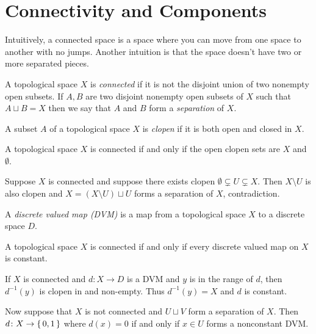 \documentclass[letterpaper, 11pt, oneside]{book}
\begin{document}
\clearpage

\chapter{Connectivity and Components}

Intuitively, a connected space is a space where you can move from one space to another with no jumps.
Another intuition is that the space doesn't have two or more separated pieces.

\begin{defn}
  A topological space $X$ is \emph{connected} if it is not the disjoint union of two nonempty open subsets.
  If $A, B$ are two disjoint nonempty open subsets of $X$ such that $A \sqcup B = X$ then we say that $A$ and $B$ form a \emph{separation} of $X$.
\end{defn}

\begin{defn}
  A subset $A$ of a topological space $X$ is \emph{clopen} if it is both open and closed in $X$.
\end{defn}

\begin{prop}
  A topological space $X$ is connected if and only if the open clopen sets are $X$ and $\emptyset$.
\end{prop}
\begin{prop}
  Suppose $X$ is connected and suppose there exists clopen $\emptyset \subsetneq U \subsetneq X$.
  Then $X \setminus U$ is also clopen and $X = (X \setminus U) \sqcup U$ forms a separation of $X$, contradiction.
\end{prop}

\begin{defn}
  A \emph{discrete valued map (DVM)} is a map from a topological space $X$ to a discrete space $D$.
\end{defn}

\begin{prop}
  A topological space $X$ is connected if and only if every discrete valued map on $X$ is constant.
\end{prop}
\begin{pf}
  If $X$ is connected and $d\colon X \to D$ is a DVM and $y$ is in the range of $d$, then $d^{-1}(y)$ is clopen in and non-empty.
  Thus $d^{-1}(y) = X$ and $d$ is constant.

  Now suppose that $X$ is not connected and $U \sqcup V$ form a separation of $X$.
  Then $d\colon X \to \set{0, 1}$ where $d(x) = 0$ if and only if $x \in U$ forms a nonconstant DVM.\@
\end{pf}
\end{document}
